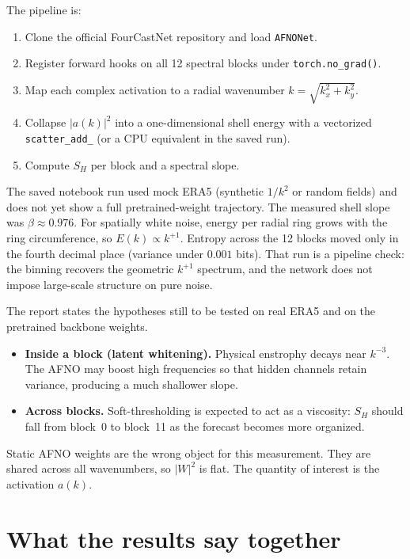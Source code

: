 \documentclass[11pt,a4paper]{article}
\begin{document}
The pipeline is:
\begin{enumerate}
  \item Clone the official FourCastNet repository and load \texttt{AFNONet}.
  \item Register forward hooks on all 12 spectral blocks under \texttt{torch.no\_grad()}.
  \item Map each complex activation to a radial wavenumber \(k = \sqrt{k_x^2 + k_y^2}\).
  \item Collapse \(|a(k)|^2\) into a one-dimensional shell energy with a vectorized \texttt{scatter\_add\_} (or a CPU equivalent in the saved run).
  \item Compute \(S_H\) per block and a spectral slope.
\end{enumerate}

The saved notebook run used mock ERA5 (synthetic \(1/k^2\) or random fields) and does not yet show a full pretrained-weight trajectory.
The measured shell slope was \(\beta \approx 0.976\).
For spatially white noise, energy per radial ring grows with the ring circumference, so \(E(k) \propto k^{+1}\).
Entropy across the 12 blocks moved only in the fourth decimal place (variance under \(0.001\) bits).
That run is a pipeline check: the binning recovers the geometric \(k^{+1}\) spectrum, and the network does not impose large-scale structure on pure noise.

The report states the hypotheses still to be tested on real ERA5 and on the pretrained backbone weights.
\begin{itemize}
  \item \textbf{Inside a block (latent whitening).} Physical enstrophy decays near \(k^{-3}\). The AFNO may boost high frequencies so that hidden channels retain variance, producing a much shallower slope.
  \item \textbf{Across blocks.} Soft-thresholding is expected to act as a viscosity: \(S_H\) should fall from block~0 to block~11 as the forecast becomes more organized.
\end{itemize}
Static AFNO weights are the wrong object for this measurement.
They are shared across all wavenumbers, so \(|W|^2\) is flat.
The quantity of interest is the activation \(a(k)\).

\section{What the results say together}
\end{document}
